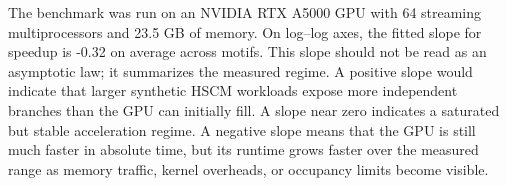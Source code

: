 The benchmark was run on an NVIDIA RTX A5000 GPU with 64 streaming multiprocessors and 23.5 GB of memory. On log--log axes, the fitted slope for speedup is -0.32 on average across motifs. This slope should not be read as an asymptotic law; it summarizes the measured regime. A positive slope would indicate that larger synthetic HSCM workloads expose more independent branches than the GPU can initially fill. A slope near zero indicates a saturated but stable acceleration regime. A negative slope means that the GPU is still much faster in absolute time, but its runtime grows faster over the measured range as memory traffic, kernel overheads, or occupancy limits become visible. 